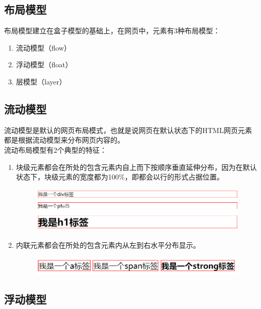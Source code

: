 \subsection{布局模型}

布局模型建立在盒子模型的基础上，在网页中，元素有3种布局模型：

\begin{enumerate}
	\item 流动模型（flow）
	\item 浮动模型（float）
	\item 层模型（layer）
\end{enumerate}

\subsection{流动模型}

流动模型是默认的网页布局模式，也就是说网页在默认状态下的HTML网页元素都是根据流动模型来分布网页内容的。 \\

流动布局模型有2个典型的特征：

\begin{enumerate}
	\item 块级元素都会在所处的包含元素内自上而下按顺序垂直延伸分布，因为在默认状态下，块级元素的宽度都为100\%，即都会以行的形式占据位置。
	      \begin{figure}[H]
		      \centering
		      \includegraphics[scale=0.7]{img/C8/8-3/1.png}
	      \end{figure}

	\item 内联元素都会在所处的包含元素内从左到右水平分布显示。
	      \begin{figure}[H]
		      \centering
		      \includegraphics[]{img/C8/8-3/2.png}
	      \end{figure}
\end{enumerate}

\subsection{浮动模型}

